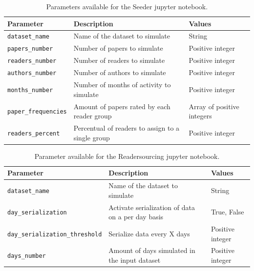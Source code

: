 \documentclass[a4paper, english]{article}
\begin{document}
\begin{table}
\centering
\begin{tabular}{p{3cm}p{7cm}p{3cm}}
\toprule
\textbf{Parameter}  & \textbf{Description} & \textbf{Values} \\
\midrule
\verb|dataset_name| & Name of the dataset to simulate & String \\
\verb|papers_number| &  Number of papers to simulate & Positive integer \\
\verb|readers_number| &  Number of readers to simulate & Positive integer \\
\verb|authors_number| &  Number of authors to simulate & Positive integer \\
\verb|months_number| &  Number of months of activity to simulate & Positive integer \\
\verb|paper_frequencies| &  Amount of papers rated by each reader group & Array of positive integers \\
\verb|readers_percent| & Percentual of readers to assign to a single group & Positive integer\\
\bottomrule
\end{tabular}
\caption{Parameters available for the Seeder jupyter notebook.}
\label{tab:seeder-notebook}
\end{table}

\begin{table}
\centering
\begin{tabular}{p{5cm}p{5.5cm}p{2.5cm}}
\toprule
\textbf{Parameter}  & \textbf{Description} & \textbf{Values} \\
\midrule
\verb|dataset_name| & Name of the dataset to simulate & String \\
\verb|day_serialization| & Activate serialization of data on a per day basis & True, False \\
\verb|day_serialization_threshold| & Serialize data every X days & Positive integer \\
\verb|days_number| & Amount of days simulated in the input dataset & Positive integer \\
\bottomrule
\end{tabular}
\caption{Parameter available for the Readersourcing jupyter notebook.}
\label{tab:readersourcing-notebook}
\end{table}

\newpage

\printbibliography[heading=bibintoc]
\end{document}
